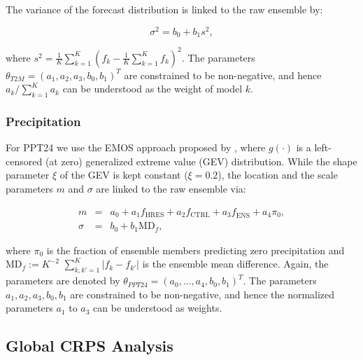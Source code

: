 The variance of the forecast distribution is linked to the raw
ensemble by: 
\begin{linenomath*}
\begin{equation}
\sigma^{2} = b_{0} + b_{1}s^{2},
\end{equation}
\end{linenomath*}
where $s^{2} = \frac{1}{K}\sum_{k=1}^{K}(f_{k} -
\frac{1}{K}\sum_{k=1}^{K}f_{k})^{2}$. The parameters
${\theta}_{T2M}=(a_{1}, a_{2}, a_{3}, b_{0}, b_{1})^{T}$ are
constrained to be non-negative, and hence $a_{k}/\sum_{k=1}^{K} a_{k}$
can be understood as the weight of model $k$.

\subsubsection{Precipitation}
For PPT24 we use the EMOS approach proposed by \citet{Scheu14}, where
$g(\cdot)$ is a left-censored (at zero) generalized extreme value
(GEV) distribution. While the shape parameter $\xi$ of the GEV is kept
constant ($\xi=0.2$), the location and the scale parameters $m$ and
$\sigma$ are linked to the raw ensemble via:
\begin{linenomath*}
\begin{eqnarray}
m &=& a_{0} + a_{1} f_{\mathrm{HRES}} + a_{2} f_{\mathrm{CTRL}} +
a_{3} f_{\overline{\mathrm{ENS}}} + a_{4} \pi_{0},\nonumber\\
\sigma &=& b_{0} + b_{1} \mathrm{MD}_{f},
\end{eqnarray}
\end{linenomath*}
where $\pi_{0}$ is the fraction of ensemble members predicting zero
precipitation and $\mathrm{MD}_{f}:= K^{-2}$\break
$\sum_{k, k' = 1}^{K} |
f_{k} - f_{k'} |$ is the ensemble mean difference. Again, the
parameters are denoted by $\theta_{PPT24}=(a_{0}, \dots, a_{4}, b_{0},
b_{1})^{T}$. The parameters $a_{1}, a_{2}, a_{3}, b_{0}, b_{1}$ are
constrained to be non-negative, and hence the normalized parameters
$a_{1}$ to $a_{3}$ can be understood as weights.

\subsection{Global CRPS Analysis}
 \label{sec:meth_glob_crps}

